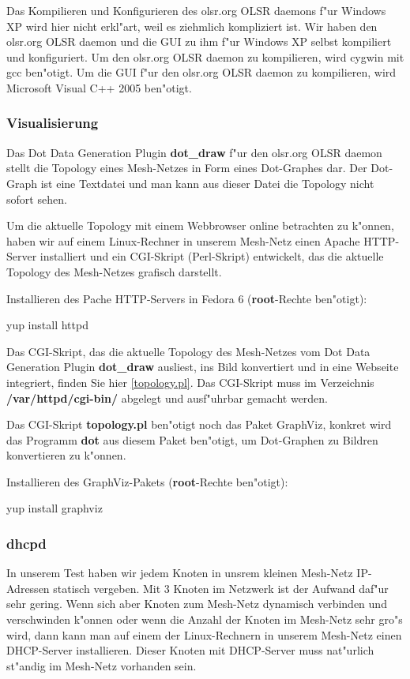 Das Kompilieren und Konfigurieren des olsr.org OLSR daemons f"ur Windows XP
wird hier nicht erkl"art, weil es ziehmlich kompliziert ist. Wir haben
den olsr.org OLSR daemon und die GUI zu ihm f"ur Windows XP selbst kompiliert
und konfiguriert. Um den olsr.org OLSR daemon zu kompilieren, wird cygwin
mit gcc ben"otigt. Um die GUI f"ur den olsr.org OLSR daemon zu kompilieren,
wird Microsoft Visual C++ 2005 ben"otigt.

\subsubsection{Visualisierung}

Das Dot Data Generation Plugin \textbf{dot\_draw} f"ur den olsr.org OLSR
daemon stellt die Topology eines Mesh-Netzes in Form eines Dot-Graphes dar.
Der Dot-Graph ist eine Textdatei und man kann aus dieser Datei die Topology
nicht sofort sehen.

Um die aktuelle Topology mit einem Webbrowser online betrachten zu k"onnen,
haben wir auf einem Linux-Rechner in unserem Mesh-Netz einen Apache
HTTP-Server installiert und ein CGI-Skript (Perl-Skript) entwickelt,
das die aktuelle Topology des Mesh-Netzes grafisch darstellt.

Installieren des Pache HTTP-Servers in Fedora 6
(\textbf{root}-Rechte ben"otigt):
\begin{shelllst}
yup install httpd
\end{shelllst}

Das CGI-Skript, das die aktuelle Topology des Mesh-Netzes vom
Dot Data Generation Plugin \textbf{dot\_draw} ausliest, ins Bild konvertiert
und in eine Webseite integriert, finden Sie hier \ref{topology.pl}.
Das CGI-Skript muss im Verzeichnis \textbf{/var/httpd/cgi-bin/} abgelegt
und ausf"uhrbar gemacht werden.

Das CGI-Skript \textbf{topology.pl} ben"otigt noch das Paket GraphViz,
konkret wird das Programm \textbf{dot} aus diesem Paket ben"otigt,
um Dot-Graphen zu Bildren konvertieren zu k"onnen.

Installieren des GraphViz-Pakets (\textbf{root}-Rechte ben"otigt):
\begin{shelllst}
yup install graphviz
\end{shelllst}

\subsubsection{dhcpd}

In unserem Test haben wir jedem Knoten in unsrem kleinen Mesh-Netz
IP-Adressen statisch vergeben. Mit 3 Knoten im Netzwerk ist der Aufwand daf"ur
sehr gering. Wenn sich aber Knoten zum Mesh-Netz dynamisch verbinden
und verschwinden k"onnen oder wenn die Anzahl der Knoten im Mesh-Netz
sehr gro"s wird, dann kann man auf einem der Linux-Rechnern in unserem
Mesh-Netz einen DHCP-Server installieren. Dieser Knoten
mit DHCP-Server muss nat"urlich st"andig im Mesh-Netz vorhanden sein.

